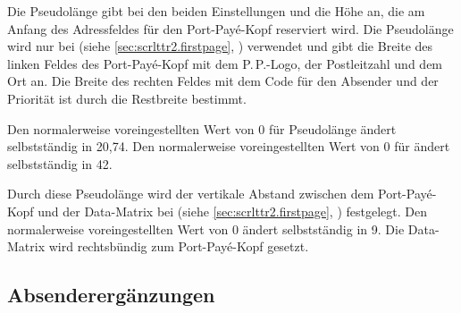 \begin{Declaration}
\end{Declaration}
Die Pseudolänge  gibt bei den beiden
Einstellungen
%
 und
%
 die Höhe an, die am Anfang
des Adressfeldes für den Port-Payé-Kopf reserviert wird. Die Pseudolänge
 wird nur bei 
(siehe \autoref{sec:scrlttr2.firstpage},
) verwendet und gibt die Breite des
linken Feldes des Port-Payé-Kopf mit dem P.\,P.-Logo, der Postleitzahl und dem
Ort an. Die Breite des rechten Feldes mit dem Code für den Absender und der
Priorität ist durch die Restbreite bestimmt.

Den  normalerweise voreingestellten Wert von 0 für
Pseudolänge  ändert \KOMAScript{} selbstständig in
20,74. Den normalerweise voreingestellten Wert von 0 für
 ändert \KOMAScript{} selbstständig in 42.%
%
\EndIndexGroup


\begin{Declaration}
\end{Declaration}
Durch diese Pseudolänge wird der vertikale
Abstand zwischen dem Port-Payé-Kopf und der Data-Matrix bei
%
%
 (siehe
\autoref{sec:scrlttr2.firstpage}, )
festgelegt. Den  normalerweise voreingestellten Wert von
0 ändert \KOMAScript{} selbstständig in 9. Die Data-Matrix
wird rechtsbündig zum Port-Payé-Kopf gesetzt.%
\EndIndexGroup
%
\EndIndexGroup


\subsection{Absenderergänzungen}
\BeginIndexGroup
{}%

